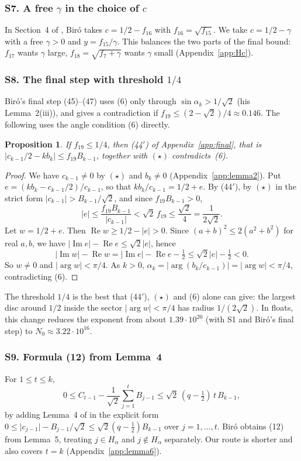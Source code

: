 \documentclass[11pt]{amsart}
\newtheorem{proposition}[theorem]{Proposition}
\theoremstyle{remark}
\theoremstyle{plain}
\newcommand{\abs}[1]{\lvert #1\rvert}
\DeclareMathOperator{\re}{Re}
\DeclareMathOperator{\im}{Im}
\begin{document}
\subsubsection*{S7. A free $\gamma$ in the choice of $c$}
In Section~4 of \cite{Bir00b}, Bir\'o takes $c=1/2-f_{16}$ with $f_{16}=\sqrt{f_{15}}$. We take $c=1/2-\gamma$ with a free $\gamma>0$ and $y=f_{15}/\gamma$. This balances the two parts of the final bound: $f_{17}$ wants $\gamma$ large, $f_{18}=\sqrt{f_7+\gamma}$ wants $\gamma$ small (Appendix~\ref{app:Hc}).

\subsubsection*{S8. The final step with threshold $1/4$}
Bir\'o's final step (45)--(47) uses (6) only through $\sin\alpha_k>1/\sqrt2$ (his Lemma~2(iii)), and gives a contradiction if $f_{19}\le(2-\sqrt2)/4\approx0.146$. The following uses the angle condition (6) directly.

\begin{proposition}\label{prop:fin}
If $f_{19}\le1/4$, then \textup{(44$'$)} of Appendix~\ref{app:final}, that is $\abs{c_{k-1}/2-kb_k}\le f_{19}B_{k-1}$, together with $(\star)$ contradicts~\textup{(6)}.
\end{proposition}

\begin{proof}
We have $c_{k-1}\ne0$ by $(\star)$ and $b_k\ne0$ (Appendix~\ref{app:lemma2}). Put $e=(kb_k-c_{k-1}/2)/c_{k-1}$, so that $kb_k/c_{k-1}=1/2+e$. By (44$'$), by $(\star)$ in the strict form $\abs{c_{k-1}}>B_{k-1}/\sqrt2$, and since $f_{19}B_{k-1}>0$,
\[
\abs e\le\frac{f_{19}B_{k-1}}{\abs{c_{k-1}}}<\sqrt2\,f_{19}\le\frac{\sqrt2}4=\frac1{2\sqrt2}.
\]
Let $w=1/2+e$. Then $\re w\ge1/2-\abs e>0$. Since $(a+b)^2\le2(a^2+b^2)$ for real $a,b$, we have $\abs{\im e}-\re e\le\sqrt2\abs e$, hence
\[
\abs{\im w}-\re w=\abs{\im e}-\re e-\tfrac12\le\sqrt2\abs e-\tfrac12<0 .
\]
So $w\ne0$ and $\abs{\arg w}<\pi/4$. As $k>0$, $\alpha_k=\abs{\arg(b_k/c_{k-1})}=\abs{\arg w}<\pi/4$, contradicting (6).
\end{proof}

The threshold $1/4$ is the best that (44$'$), $(\star)$ and (6) alone can give: the largest disc around $1/2$ inside the sector $\abs{\arg w}<\pi/4$ has radius $1/(2\sqrt2)$. In floats, this change reduces the exponent from about $1.39\cdot10^{20}$ (with S1 and Bir\'o's final step) to $N_0\approx3.22\cdot10^{16}$.

\subsubsection*{S9. Formula (12) from Lemma~4}
For $1\le t\le k$,
\begin{equation}\tag{12$'$}
  0\le C_{t-1}-\frac1{\sqrt2}\sum_{j=1}^tB_{j-1}\le\sqrt2\,(q-\tfrac12)\,t\,B_{k-1},
\end{equation}
by adding Lemma~4 of \cite{Bir00b} in the explicit form $0\le\abs{c_{j-1}}-B_{j-1}/\sqrt2\le\sqrt2(q-\frac12)B_{k-1}$ over $j=1,\dots,t$. Bir\'o obtains (12) from Lemma~5, treating $j\in H_\alpha$ and $j\notin H_\alpha$ separately. Our route is shorter and also covers $t=k$ (Appendix~\ref{app:lemma6}).
\end{document}
